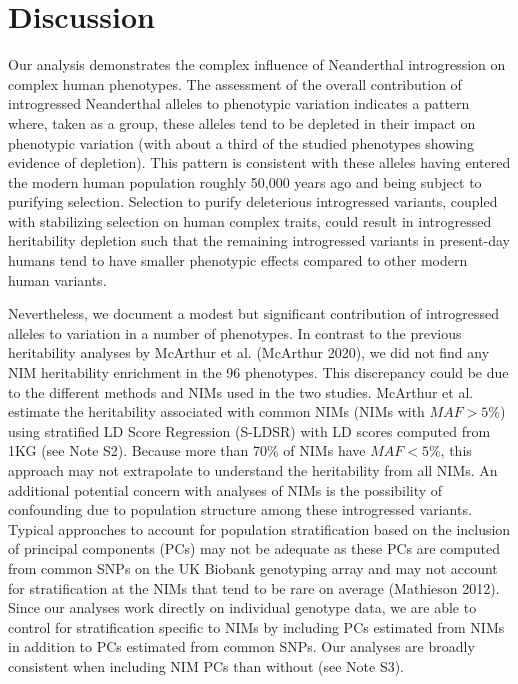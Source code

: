 \section{Discussion}
Our analysis demonstrates the complex influence of Neanderthal introgression on complex human phenotypes. The assessment of the overall contribution of introgressed Neanderthal alleles to phenotypic variation indicates a pattern where, taken as a group, these alleles tend to be depleted in their impact on phenotypic variation (with about a third of the studied phenotypes showing evidence of depletion). This pattern is consistent with these alleles having entered the modern human population roughly 50,000 years ago and being subject to purifying selection. Selection to purify deleterious introgressed variants, coupled with stabilizing selection on human complex traits, could result in introgressed heritability depletion such that the remaining introgressed variants in present-day humans tend to have smaller phenotypic effects compared to other modern human variants. 

Nevertheless, we document a modest but significant contribution of introgressed alleles to variation in a number of phenotypes. In contrast to the previous heritability analyses by McArthur et al. (McArthur 2020), we did not find any NIM heritability enrichment in the 96 phenotypes. This discrepancy could be due to the different methods and NIMs used in the two studies. McArthur et al. estimate the heritability associated with common NIMs (NIMs with $MAF > 5\%$) using stratified LD Score Regression (S-LDSR) with LD scores computed from 1KG (see Note S2). Because more than 70\% of NIMs have $MAF < 5\%$, this approach may not extrapolate to understand the heritability from all NIMs. An additional potential concern with analyses of NIMs is the possibility of confounding due to population structure among these introgressed variants. Typical approaches to account for population stratification based on the inclusion of principal components (PCs) may not be adequate as these PCs are computed from common SNPs on the UK Biobank genotyping array and may not account for stratification at the NIMs that tend to be rare on average (Mathieson 2012). Since our analyses work directly on individual genotype data, we are able to control for stratification specific to NIMs by including PCs estimated from NIMs in addition to PCs estimated from common SNPs. Our analyses are broadly consistent when including NIM PCs than without (see Note S3). 

